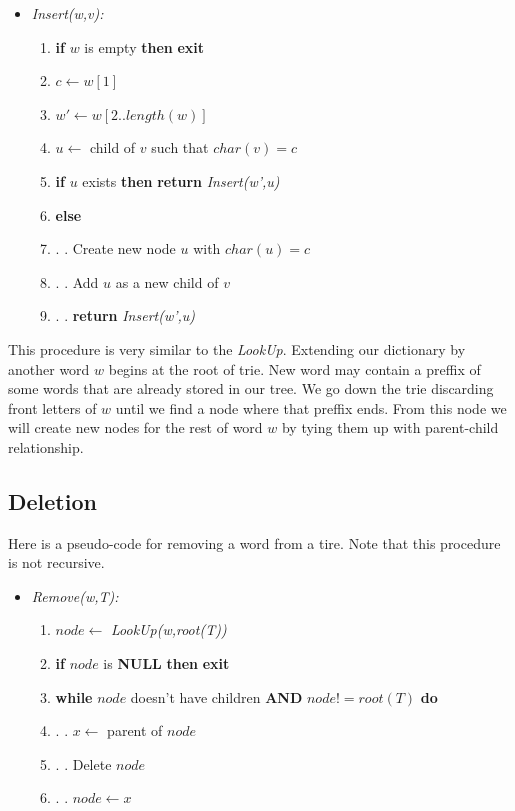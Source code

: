 \documentclass[a4paper,12pt]{article}
\begin{document}
\begin{itemize}
\item {\em Insert(w,v):}
	\begin{enumerate}
	\item {\bf if} $w$ is empty {\bf then} {\bf exit} 
	\item $c  \gets w[1]$
	\item $w' \gets w[2..length(w)]$
	\item $u  \gets$ child of $v$ such that $char(v)=c$
	\item {\bf if} $u$ exists {\bf then} {\bf return} {\em Insert(w',u)}
	\item {\bf else}
	\item . . Create new node $u$ with $char(u)=c$
	\item . . Add $u$ as a new child of $v$ 
	\item . . {\bf return} {\em Insert(w',u)}
	\end{enumerate}
\end{itemize}

This procedure is very similar to the {\em LookUp}. Extending our dictionary by another word $w$ begins at the root of trie. New word may contain a preffix of some words that are already stored in our tree. We go down the trie discarding front letters of $w$ until we find a node where that preffix ends. From this node we will create new nodes for the rest of word $w$ by tying them up with parent-child relationship.

\subsection{Deletion}

Here is a pseudo-code for removing a word from a tire. Note that this procedure is not recursive.

\begin{itemize}
\item {\em Remove(w,T):}
	\begin{enumerate}
	\item $node \gets$ {\em LookUp(w,root(T))}
	\item {\bf if} $node$ is {\bf NULL} {\bf then} {\bf exit}  
	\item {\bf while} $node$ doesn't have children {\bf AND} $node != root(T)$ {\bf do}
	\item . . $x \gets$ parent of $node$
	\item . . Delete $node$
	\item . . $node \gets x$ 
	\end{enumerate}
\end{itemize}
\end{document}
